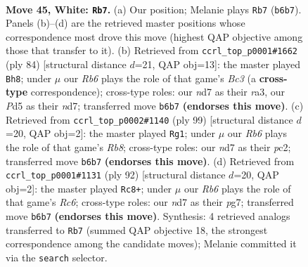 \documentclass[11pt]{article}
\begin{document}
\clearpage

\begin{figure}[p]\centering
\begin{subfigure}{0.46\textwidth}\centering
\resizebox{\linewidth}{!}{%
\newchessgame
\chessboard[
  setfen={4k3/3n4/1R6/1P1P4/p1p3P1/8/1PK5/7r w - - 1 45},
  showmover=false,
  pgfstyle=straightmove, color=movearrow, markmove={b6-b7}
]}
\caption{}
\end{subfigure}\hfill
\begin{subfigure}{0.46\textwidth}\centering
\resizebox{\linewidth}{!}{%
\newchessgame
\chessboard[
  setfen={8/1p1nk3/6R1/8/1Pp3P1/r1B5/7P/6K1 w - - 1 43},
  showmover=false,
  pgfstyle=straightmove, color=movearrow, markmove={c3-h8}
]}
\caption{}
\end{subfigure}
\\[4pt]
\begin{subfigure}{0.46\textwidth}\centering
\resizebox{\linewidth}{!}{%
\newchessgame
\chessboard[
  setfen={8/3R4/kp6/8/Pp1p4/8/K1P5/1r6 b - - 3 50},
  showmover=false,
  pgfstyle=straightmove, color=movearrow, markmove={b1-g1}
]}
\caption{}
\end{subfigure}\hfill
\begin{subfigure}{0.46\textwidth}\centering
\resizebox{\linewidth}{!}{%
\newchessgame
\chessboard[
  setfen={6k1/6p1/P1R5/7p/7P/4p1P1/r7/4K3 w - - 1 47},
  showmover=false,
  pgfstyle=straightmove, color=movearrow, markmove={c6-c8}
]}
\caption{}
\end{subfigure}
\caption{\textbf{Move 45, White: \texttt{Rb7}.} (a) Our position; Melanie plays \texttt{Rb7} (\texttt{b6b7}). Panels (b)--(d) are the retrieved master positions whose correspondence most drove this move (highest QAP objective among those that transfer to it). (b) Retrieved from \texttt{ccrl\_top\_p0001\#1662} (ply 84) [structural distance $d$=21, QAP obj=13]: the master played \texttt{Bh8}; under $\mu$ our \emph{Rb6} plays the role of that game's \emph{Bc3} (a \textbf{cross-type} correspondence); cross-type roles: our \emph{n}d7 as their \emph{r}a3, our \emph{P}d5 as their \emph{n}d7; transferred move \texttt{b6b7} \textbf{(endorses this move)}. (c) Retrieved from \texttt{ccrl\_top\_p0002\#1140} (ply 99) [structural distance $d$=20, QAP obj=2]: the master played \texttt{Rg1}; under $\mu$ our \emph{Rb6} plays the role of that game's \emph{Rb8}; cross-type roles: our \emph{n}d7 as their \emph{p}c2; transferred move \texttt{b6b7} \textbf{(endorses this move)}. (d) Retrieved from \texttt{ccrl\_top\_p0001\#1131} (ply 92) [structural distance $d$=20, QAP obj=2]: the master played \texttt{Rc8+}; under $\mu$ our \emph{Rb6} plays the role of that game's \emph{Rc6}; cross-type roles: our \emph{n}d7 as their \emph{p}g7; transferred move \texttt{b6b7} \textbf{(endorses this move)}. Synthesis: 4 retrieved analogs transferred to \texttt{Rb7} (summed QAP objective 18, the strongest correspondence among the candidate moves); Melanie committed it via the \texttt{search} selector.}
\label{fig:thought-m88}
\end{figure}
\end{document}
